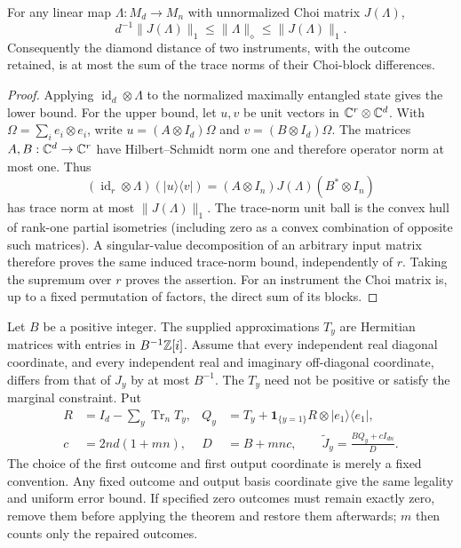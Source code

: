 \begin{lemma}\label{lem:choidiamond66}
For any linear map $\Lambda:M_d\to M_n$ with unnormalized Choi matrix
$J(\Lambda)$,
\[
 d^{-1}\|J(\Lambda)\|_1\le\|\Lambda\|_\diamond
                                      \le\|J(\Lambda)\|_1.
\]
Consequently the diamond distance of two instruments, with the outcome
retained, is at most the sum of the trace norms of their Choi-block
differences.
\end{lemma}
\begin{proof}
Applying $\operatorname{id}_d\otimes\Lambda$ to the normalized
maximally entangled state gives the lower bound. For the upper bound,
let $u,v$ be unit vectors in $\mathbb C^r\otimes\mathbb C^d$. With
$\Omega=\sum_i e_i\otimes e_i$, write
$u=(A\otimes I_d)\Omega$ and $v=(B\otimes I_d)\Omega$.
The matrices $A,B:\mathbb C^d\to\mathbb C^r$ have Hilbert--Schmidt norm one and
therefore operator norm at most one. Thus
\[
 (\operatorname{id}_r\otimes\Lambda)(|u\rangle\langle v|)
       =(A\otimes I_n)J(\Lambda)(B^*\otimes I_n)
\]
has trace norm at most $\|J(\Lambda)\|_1$. The trace-norm unit ball
is the convex hull of rank-one partial isometries (including zero as a
convex combination of opposite such matrices). A singular-value
decomposition of an arbitrary input matrix therefore proves the same induced
trace-norm bound, independently of $r$. Taking the supremum over $r$
proves the assertion. For an instrument the Choi matrix is, up to a
fixed permutation of factors, the direct sum of its blocks.
\end{proof}

Let $B$ be a positive integer. The supplied approximations $T_y$ are
Hermitian matrices with entries in $B^{-1}\mathbb Z[i]$. Assume that every
independent real diagonal coordinate, and every independent real and
imaginary off-diagonal coordinate, differs from that of $J_y$ by at
most $B^{-1}$. The $T_y$ need not be positive or satisfy the marginal
constraint. Put
\begin{align}
 R&=I_d-\sum_y\operatorname{Tr}_{n}T_y,&
 Q_y&=T_y+\mathbf1_{\{y=1\}}R\otimes|e_1\rangle\langle e_1|,
                                                    \label{eq:choirepair66}\\
 c&=2nd(1+mn),&D&=B+mnc,\qquad
 \widetilde J_y=\frac{BQ_y+cI_{dn}}{D}.\label{eq:choigrid66}
\end{align}
The choice of the first outcome and first output coordinate is merely
a fixed convention. Any fixed outcome and output basis coordinate give
the same legality and uniform error bound. If specified zero outcomes
must remain exactly zero, remove them before applying the theorem and
restore them afterwards; $m$ then counts only the repaired outcomes.

